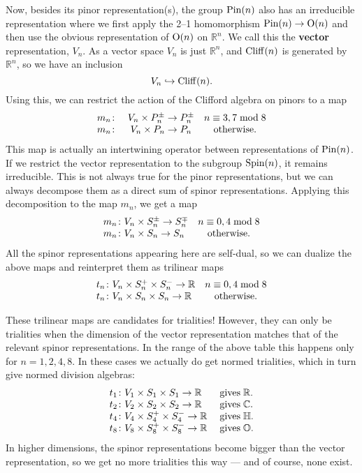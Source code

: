 \documentclass[12pt]{article}
\newcommand\R{{\mathbb R}}
\newcommand\C{{\mathbb C}}
\renewcommand\H{{\mathbb H}}
\renewcommand\O{{\mathbb O}}
\newcommand{\Cliff}{{\rm Cliff}}
\newcommand{\OO}{{\rm O}}
\newcommand{\Spin}{{\rm Spin}}
\newcommand{\Pin}{{\rm Pin}}
\newcommand{\maps}{\colon}
\begin{document}
Now, besides its pinor representation(s), the group $\Pin(n)$ also has
an irreducible representation where we first apply the 2--1 homomorphism
$\Pin(n) \to \OO(n)$ and then use the obvious representation of $\OO(n)$
on $\R^n$.  We call this the {\bf vector} representation, $V_n$.  As a
vector space $V_n$ is just $\R^n$, and $\Cliff(n)$ is generated by
$\R^n$, so we have an inclusion
\[                  V_n \hookrightarrow \Cliff(n)  .\]  
Using this, we can restrict the action of the Clifford algebra on pinors  
to a map  
\[    
\begin{array}{lcc}       
m_n \maps& V_n \times P_n^\pm \to P_n^\pm &n \equiv 3,7 \bmod 8  \\  
m_n \maps& V_n \times P_n \to P_n         & {\rm otherwise.}   
\end{array}   
\]  
This map is actually an intertwining operator between 
representations of $\Pin(n)$.  If we restrict the vector representation 
to the subgroup $\Spin(n)$, it remains irreducible.  This is not always 
true for the pinor representations, but we can always decompose them as 
a direct sum of spinor representations.  Applying this decomposition to 
the map $m_n$, we get a map 
\[    
\begin{array}{lc}        
m_n \maps V_n \times S_n^\pm \to S_n^\mp   &n \equiv 0,4 \bmod 8  \\   
m_n \maps V_n \times S_n \to S_n         & {\rm otherwise.}    
\end{array}    
\]   
All the spinor representations appearing here are self-dual, so we can  
dualize the above maps and reinterpret them as trilinear maps   
\[  
\begin{array}{lc}        
t_n \maps V_n \times S_n^+ \times S_n^- \to \R  & n \equiv 0,4 \bmod 8  \\   
t_n \maps V_n \times S_n \times S_n \to \R      & {\rm otherwise.}    
\end{array}   
\]   
 
These trilinear maps are candidates for trialities!  However, they can  
only be trialities when the dimension of the vector representation  
matches that of the relevant spinor representations.    In the range of  
the above table this happens only for $n = 1,2,4,8$.  In these cases we 
actually do get normed trialities, which in turn give normed division algebras: 
\[ 
\begin{array}{ll} 
  t_1 \maps V_1 \times S_1 \times S_1 \to \R  & 
{\rm \; gives \;} \R.   \\ 
   t_2 \maps V_2 \times S_2 \times S_2 \to \R & 
{\rm \; gives \;} \C.    \\ 
   t_4 \maps V_4 \times S_4^+ \times S_4^- \to \R & 
{\rm \; gives \;} \H.    \\ 
   t_8 \maps V_8 \times S_8^+ \times S_8^- \to \R & 
{\rm \; gives \;} \O .  
\end{array} 
\] 
In higher dimensions, the spinor representations become bigger than the 
vector representation, so we get no more trialities this way --- and of 
course, none exist.  
 
\end{document}
